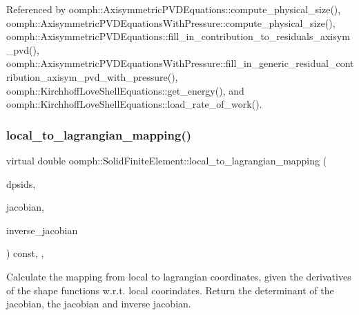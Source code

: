 Referenced by oomph\+::\+Axisymmetric\+P\+V\+D\+Equations\+::compute\+\_\+physical\+\_\+size(), oomph\+::\+Axisymmetric\+P\+V\+D\+Equations\+With\+Pressure\+::compute\+\_\+physical\+\_\+size(), oomph\+::\+Axisymmetric\+P\+V\+D\+Equations\+::fill\+\_\+in\+\_\+contribution\+\_\+to\+\_\+residuals\+\_\+axisym\+\_\+pvd(), oomph\+::\+Axisymmetric\+P\+V\+D\+Equations\+With\+Pressure\+::fill\+\_\+in\+\_\+generic\+\_\+residual\+\_\+contribution\+\_\+axisym\+\_\+pvd\+\_\+with\+\_\+pressure(), oomph\+::\+Kirchhoff\+Love\+Shell\+Equations\+::get\+\_\+energy(), and oomph\+::\+Kirchhoff\+Love\+Shell\+Equations\+::load\+\_\+rate\+\_\+of\+\_\+work().

\mbox{\label{classoomph_1_1SolidFiniteElement_a8974f3df67362e2b1be171b71294b16c}} 
\subsubsection{\texorpdfstring{local\+\_\+to\+\_\+lagrangian\+\_\+mapping()}{local\_to\_lagrangian\_mapping()}\hspace{0.1cm}{\footnotesize\ttfamily [1/2]}}
{\footnotesize\ttfamily virtual double oomph\+::\+Solid\+Finite\+Element\+::local\+\_\+to\+\_\+lagrangian\+\_\+mapping (\begin{DoxyParamCaption}\item[{const \hyperlink{classoomph_1_1DShape}{D\+Shape} \&}]{dpsids,  }\item[{\hyperlink{classoomph_1_1DenseMatrix}{Dense\+Matrix}$<$ double $>$ \&}]{jacobian,  }\item[{\hyperlink{classoomph_1_1DenseMatrix}{Dense\+Matrix}$<$ double $>$ \&}]{inverse\+\_\+jacobian }\end{DoxyParamCaption}) const\hspace{0.3cm}{\ttfamily [inline]}, {\ttfamily [protected]}, {\ttfamily [virtual]}}



Calculate the mapping from local to lagrangian coordinates, given the derivatives of the shape functions w.\+r.\+t. local coorindates. Return the determinant of the jacobian, the jacobian and inverse jacobian. 



